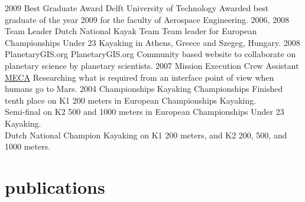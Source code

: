 \documentclass[]{friggeri-cv}
\begin{document}
\begin{entrylist}
  \entry
    {2009}
    {Best Graduate Award}
    {Delft University of Technology}
    {Awarded best graduate of the year 2009 for the faculty of Aerospace Engineering.}
  \entry
    {2006, 2008}
    {Team Leader}
    {Dutch National Kayak Team}
    {Team leader for European Championships Under 23 Kayaking in Athens, Greece and Szegeg, Hungary.}
  \entry
    {2008}
    {PlanetaryGIS.org}
    {PlanetaryGIS.org}
    {Community based website to collaborate on planetary science by planetary scientists.}
  \entry
    {2007}
    {Mission Execution Crew Assistant}
    {\href{http:\\crewassistant.com}{MECA}}
    {Researching what is required from an interface point of view when humans go to Mars.}
  \entry
    {2004}
    {Championships}
    {Kayaking Championships}
    {Finished tenth place on K1 200 meters in European Championships Kayaking. \\
    Semi-final on K2 500 and 1000 meters in European Championships Under 23 Kayaking. \\
    Dutch National Champion Kayaking on K1 200 meters, and K2 200, 500, and 1000 meters.
    }
\end{entrylist}

\section{publications}

\begin{refsection}
  \nocite{*}
  \printbibliography[sorting=chronological, type=inproceedings, title={international peer-reviewed conferences/proceedings}, notkeyword={france}, heading=subbibliography]
\end{refsection}
\begin{refsection}
  \nocite{*}
  \printbibliography[sorting=chronological, type=inproceedings, title={local peer-reviewed conferences/proceedings}, keyword={france}, heading=subbibliography]
\end{refsection}
\end{document}
